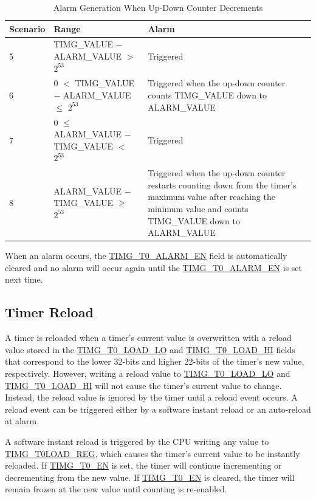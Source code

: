 \documentclass[main\_\_EN.tex]{subfiles}
\begin{document}
\begin{table}[H]
\centering
\caption{Alarm Generation When Up-Down Counter Decrements}
\label{tab:timg-alarm-generation-down}

\begin{tabular}{|l|l|m{7cm}|}
\hline
\rowcolor{lightgray}
    \textbf{Scenario} & \textbf{Range} & \textbf{Alarm} \\\hline
     5 & TIMG\_VALUE $-$ ALARM\_VALUE  $>$ $2^{53}$ & Triggered \\\hline
     6 &  0 $<$ TIMG\_VALUE $-$ ALARM\_VALUE $\leq$ $2^{53}$ & Triggered when the up-down counter counts TIMG\_VALUE down to ALARM\_VALUE \\\hline
     7 & 0 $\leq$ ALARM\_VALUE $-$ TIMG\_VALUE $<$ $2^{53}$ & Triggered \\\hline
     8 & ALARM\_VALUE $-$ TIMG\_VALUE $\geq$ $2^{53}$ & Triggered when the up-down counter restarts counting down from the timer's maximum value after reaching the minimum value and counts TIMG\_VALUE down to ALARM\_VALUE \\\hline

\end{tabular}
\end{table}

When an alarm occurs, the \hyperref[fielddesc:TIMGTXALARMEN]{TIMG\_T0\_ALARM\_EN} field is automatically cleared and no alarm will occur again until the \hyperref[fielddesc:TIMGTXALARMEN]{TIMG\_T0\_ALARM\_EN} is set next time.

\subsection{Timer Reload} \label{sec:timg-func-descr-reload}
A timer is reloaded when a timer's current value is overwritten with a reload value stored in the \hyperref[fielddesc:TIMGTXLOADLO]{TIMG\_T0\_LOAD\_LO} and \hyperref[fielddesc:TIMGTXLOADHI]{TIMG\_T0\_LOAD\_HI} fields that correspond to the lower 32-bits and higher 22-bits of the timer's new value, respectively. However, writing a reload value to \hyperref[fielddesc:TIMGTXLOADLO]{TIMG\_T0\_LOAD\_LO} and \hyperref[fielddesc:TIMGTXLOADHI]{TIMG\_T0\_LOAD\_HI} will not cause the timer's current value to change. Instead, the reload value is ignored by the timer until a reload event occurs. A reload event can be triggered either by a software instant reload or an auto-reload at alarm.

A software instant reload is triggered by the CPU writing any value to \hyperref[regdesc:TIMGTXLOADREG]{TIMG\_T0LOAD\_REG}, which causes the timer's current value to be instantly reloaded. If \hyperref[fielddesc:TIMGTXEN]{TIMG\_T0\_EN} is set, the timer will continue incrementing or decrementing from the new value. If \hyperref[fielddesc:TIMGTXEN]{TIMG\_T0\_EN} is cleared, the timer will remain frozen at the new value until counting is re-enabled. 
\end{document}
